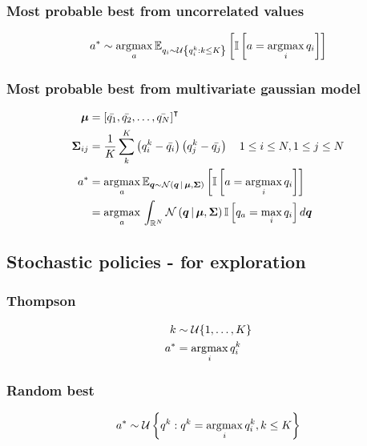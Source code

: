 \documentclass[10pt]{article}
\begin{document}
\subsubsection{Most probable best from uncorrelated values}
\begin{equation}
	a^* \sim \argmax{a} \expected[q_i \sim \mathcal{U}\left\lbrace q^k_i : k \le K \right\rbrace]{\iverson{ a = \argmax{i}{q_i}}}
\end{equation}

\subsubsection{Most probable best from multivariate gaussian model}
\begin{align}
	\tensor{\mu}         & = \trans{\left[ \bar{q_1}, \bar{q_2}, \ldots, \bar{q_N} \right]}                                                         \\
	\tensor{\Sigma}_{ij} & = \frac{1}{K}\sum_{k}^{K}\left(q^k_i -\bar{q_i}\right) \left( q^k_j -\bar{q_j}\right) \quad 1 \le i \le N, 1 \le j \le N \\
	a^*                  & = \argmax{a}
	\expected[{\tensor{q} \sim \func[\mathcal{N}]{\tensor{q} \cond \tensor{\mu}, \tensor{\Sigma} }}]{%
		\iverson{a = \argmax{i} q_i}}                                                                                                                   \\
	                     & = \argmax{a} \int_{\mathbb{R}^N} \func[\mathcal{N}]{\tensor{q} \cond \tensor{\mu}, \tensor{\Sigma} }
	\iverson{q_a = \max_{i} q_i} d\tensor{q}
\end{align}

\subsection{Stochastic policies - for exploration}

\subsubsection{Thompson}
\begin{align*}
	k & \sim \mathcal{U}\lbrace 1, \ldots, K \rbrace \\ a^* &= \argmax{i} q^k_i
\end{align*}

\subsubsection{Random best}
\begin{align*}
	a^* \sim \mathcal{U}\left\lbrace q^k : q^k =
	\argmax{i} q^k_i, k \le K \right\rbrace
\end{align*}
\end{document}
